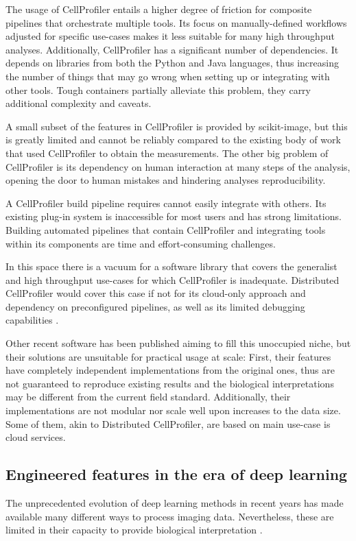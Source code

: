 \documentclass{article}
\begin{document}
The usage of CellProfiler entails a higher degree of friction for composite pipelines that orchestrate multiple tools. Its focus on manually-defined workflows adjusted for specific use-cases makes it less suitable for many high throughput analyses. Additionally, CellProfiler has a significant number of dependencies. It depends on libraries from both the Python and Java languages, thus increasing the number of things that may go wrong when setting up or integrating with other tools. Tough containers partially alleviate this problem, they carry additional complexity and caveats.

A small subset of the features in CellProfiler is provided by scikit-image, but this is greatly limited and cannot be reliably compared to the existing body of work that used CellProfiler to obtain the measurements. The other big problem of CellProfiler is its dependency on human interaction at many steps of the analysis, opening the door to human mistakes and hindering analyses reproducibility.

A CellProfiler build pipeline requires cannot easily integrate with others. Its existing plug-in system is inaccessible for most users and has strong limitations. Building automated pipelines that contain CellProfiler and integrating tools within its components are time and effort-consuming challenges.

In this space there is a vacuum for a software library that covers the generalist and high throughput use-cases for which CellProfiler is inadequate. Distributed CellProfiler would cover this case if not for its cloud-only approach and dependency on preconfigured pipelines, as well as its limited debugging capabilities \citep{mcquinCellProfiler30Nextgeneration2018}.

Other recent software has been published aiming to fill this unoccupied niche, but their solutions are unsuitable for practical usage at scale: First, their features have completely independent implementations from the original ones, thus are not guaranteed to reproduce existing results and the biological interpretations may be different from the current field standard. Additionally, their implementations are not modular nor scale well upon increases to the data size. Some of them, akin to Distributed CellProfiler, are based on main use-case is cloud services.
\subsection{Engineered features in the era of deep learning}
\label{sec:org9dc3dfa}
The unprecedented evolution of deep learning methods in recent years has made available many different ways to process imaging data. Nevertheless, these are limited in their capacity to provide biological interpretation \citep{moenDeepLearningCellular2019}.
\end{document}
